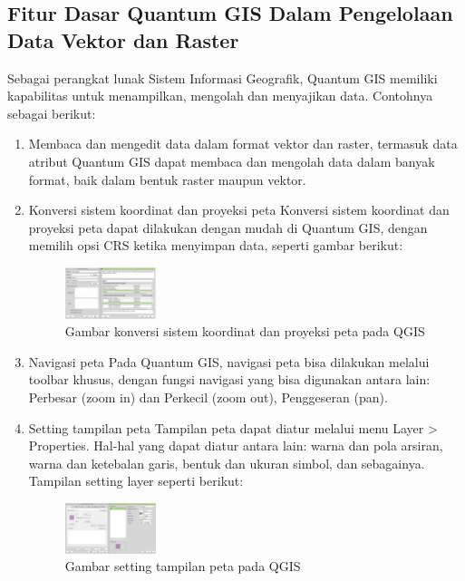 \subsection{Fitur Dasar Quantum GIS Dalam Pengelolaan Data Vektor dan Raster}
Sebagai perangkat lunak Sistem Informasi Geografik, Quantum GIS memiliki kapabilitas untuk menampilkan, mengolah dan menyajikan data. Contohnya sebagai berikut:
\begin{enumerate}
\item
Membaca dan mengedit data dalam format vektor dan raster, termasuk data atribut
Quantum GIS dapat membaca dan mengolah data dalam banyak format, baik dalam bentuk raster maupun vektor.
\item
Konversi sistem koordinat dan proyeksi peta
Konversi sistem koordinat dan proyeksi peta dapat dilakukan dengan mudah di Quantum GIS, dengan memilih opsi CRS ketika menyimpan data, seperti gambar berikut:
\begin{figure}[ht]
    \centerline{\includegraphics[width=0.25\textwidth]{figures/proyeksi}}
    \caption{Gambar konversi sistem koordinat dan proyeksi peta pada QGIS}
    \label{proyeksi}
    \end{figure}
\item
Navigasi peta
Pada Quantum GIS, navigasi peta bisa dilakukan melalui toolbar khusus, dengan fungsi navigasi yang bisa digunakan antara lain: Perbesar (zoom in) dan Perkecil (zoom out), Penggeseran (pan).
\item
Setting tampilan peta
Tampilan peta dapat diatur melalui menu Layer > Properties. Hal-hal yang dapat diatur antara lain: warna dan pola arsiran, warna dan ketebalan garis, bentuk dan ukuran simbol, dan sebagainya. Tampilan setting layer seperti berikut:
\begin{figure}[ht]
    \centerline{\includegraphics[width=0.25\textwidth]{figures/setting}}
    \caption{Gambar setting tampilan peta pada QGIS}
    \label{setting}
    \end{figure}
\end{enumerate}


